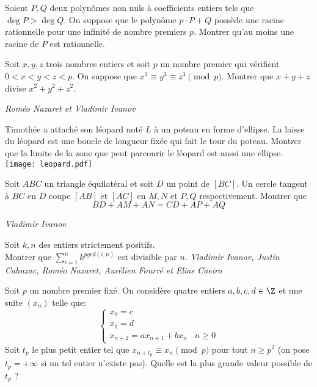 \begin{exo}{}
Soient $P,Q$ deux polynômes non nuls à coefficients entiers tels que $ \deg P>\deg Q$. On suppose que le polynôme $p \cdot P+Q$ possède une racine rationnelle pour une infinité de nombre premiers $p$. Montrer qu'au moins une racine de $P$ est rationnelle.
\end{exo}



\begin{exo}{}
Soit $x,y,z$ trois nombres entiers et soit $p$ un nombre premier qui vérifient $0<x<y<z<p$. On suppose que $x^3\equiv y^3\equiv z^3\pmod p$. Montrer que $x+y+z$ divise $x^2+y^2+z^2$.

\medskip
\textit{Roméo Nazaret et Vladimir Ivanov}
\end{exo}


\begin{exo}{}
 Timothée a attaché son léopard noté $L$ à un poteau en forme d'ellipse. La laisse du léopard est une boucle de longueur fixée qui fait le tour du poteau. Montrer que la limite de la zone que peut parcourir le léopard est aussi une ellipse. \\
\texttt{[image: leopard.pdf]}\end{exo}





\begin{exo}{}
Soit $ABC$ un triangle équilatéral et soit $D$ un point de $[BC]$. Un cercle tangent à $BC$ en $D$ coupe $[AB]$ et $[AC]$ en $M,N$ et $P,Q$ respectivement. Montrer que
$$BD+AM+AN=CD+AP+AQ$$

\medskip
\textit{Vladimir Ivanov}
\end{exo}

\begin{exo}{}
Soit $k, n$ des entiers strictement positifs. \\
Montrer que $\sum\limits_{i=1}^n k^{pgcd(i,n)}$ est divisible par $n$.
\medskip
\textit{Vladimir Ivanov, Justin Cahuzac, Roméo Nazaret, Aurélien Fourré et Elias Caeiro}
\end{exo}



\begin{exo}{}
Soit $p$ un nombre premier fixé. On considère quatre entiers $a,b,c,d\in \Z$ et une suite $(x_n)$ telle que:
$$\begin{cases}x_0=c \\x_1=d \\x_{n+2}=ax_{n+1}+bx_n ~~~~n\ge 0\end{cases}$$
Soit $t_p$ le plus petit entier tel que $x_{n+t_p}\equiv x_n\pmod p$ pour tout $n\ge p^2$ (on pose $t_p=+\infty$ si un tel entier n'existe pas). Quelle est la plus grande valeur possible de $t_p$ ? \\~~\\
\end{exo}





